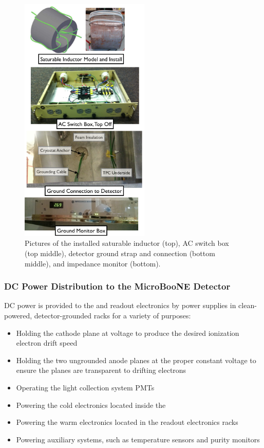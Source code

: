 \begin{figure}
\centering
\includegraphics[width=0.55\textwidth]{./figures/PowerDiagPic2.png}
\caption[]{Pictures of the installed saturable inductor (top), AC switch box (top middle), detector ground strap and connection (bottom middle), and impedance monitor (bottom).}
\label{fig:ElecInfAC2}
\end{figure}



\subsubsection{DC Power Distribution to the MicroBooNE Detector}
DC power is provided to the \lartpc and readout electronics by power supplies in clean-powered, detector-grounded racks for a variety of purposes:
\begin{itemize}
\item{Holding the \lartpc cathode plane at voltage to produce the desired ionization electron drift speed}
\item{Holding the two ungrounded anode planes at the proper constant voltage to ensure the planes are transparent to drifting electrons}
\item{Operating the light collection system PMTs}
\item{Powering the cold electronics located inside the \lartpc}
\item{Powering the warm electronics located in the \lartpc readout electronics racks}
\item{Powering auxiliary systems, such as \lartpc temperature sensors and purity monitors}
\end{itemize}

